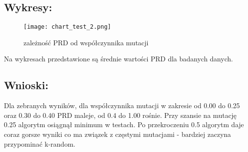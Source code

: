   \subsection{Wykresy: }
    \begin{figure}[H]
      \texttt{[image: chart\_test\_2.png]}
      \centering
      \caption{zależność PRD od współczynnika mutacji}
    \end{figure}
  Na wykresach przedstawione są średnie wartości PRD dla badanych danych.

  \subsection{Wnioski: }
  Dla zebranych wyników, dla współczynnika mutacji w zakresie od 0.00 do 0.25 oraz 0.30 do 0.40 PRD maleje, od 0.4 do 1.00 rośnie. Przy szansie na mutację 0.25 algorytm osiągnął minimum w testach. Po przekroczeniu 0.5 algorytm daje coraz gorsze wyniki co ma związek z częstymi mutacjami - bardziej zaczyna przypominać k-random.


